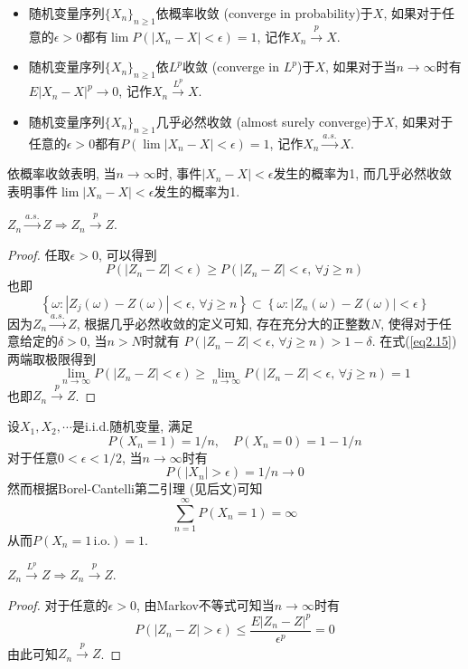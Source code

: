 \documentclass[cn, 12pt, math=mtpro2, bibstyle=apa, blue, twocol]{elegantbook}
\newcommand{\limn}{\lim_{n\to\infty}}
\begin{document}
\begin{definition}
\begin{itemize}
\item 随机变量序列$\{X_n\}_{n\ge1}$依概率收敛 (converge in probability)于$X$, 如果对于任意的$\epsilon>0$都有$\lim P(|X_n-X|<\epsilon)=1$, 记作$X_n\xrightarrow{p}X$.
\item 随机变量序列$\{X_n\}_{n\ge1}$依$L^p$收敛 (converge in $L^p$)于$X$, 如果对于当$n\to\infty$时有$E|X_n-X|^p\to0$, 记作$X_n\xrightarrow{L^p}X$.
\item 随机变量序列$\{X_n\}_{n\ge1}$几乎必然收敛 (almost surely converge)于$X$, 如果对于任意的$\epsilon>0$都有$P(\lim |X_n-X|<\epsilon)=1$, 记作$X_n\xrightarrow{a.s.}X$.
\end{itemize}
\end{definition}
\begin{remark}
依概率收敛表明, 当$n\to\infty$时, 事件$|X_n-X|<\epsilon$发生的概率为1, 而几乎必然收敛表明事件$\lim |X_n-X|<\epsilon$发生的概率为1.
\end{remark}
\begin{theorem}
$Z_n\xrightarrow{a.s.}Z\Rightarrow Z_n\xrightarrow{p}Z$.
\end{theorem}
\begin{proof}
  任取$\epsilon>0$, 可以得到
  \begin{equation}\label{eq2.15}
    P(|Z_n-Z|<\epsilon)\geq P(|Z_n-Z|<\epsilon,\,\forall j\geq n)
  \end{equation}
  也即
  $$\left\{\omega: |Z_j(\omega)-Z(\omega)|<\epsilon,\,\forall j\geq n\right\}\subset\left\{\omega: |Z_n(\omega)-Z(\omega)|<\epsilon\right\}$$
  因为$Z_n\xrightarrow{a.s.}Z$, 根据几乎必然收敛的定义可知, 存在充分大的正整数$N$, 使得对于任意给定的$\delta>0$, 当$n>N$时就有
  $P(|Z_n-Z|<\epsilon,\,\forall j\geq n)>1-\delta$. 在式(\ref{eq2.15})两端取极限得到
  $$\limn P(|Z_n-Z|<\epsilon)\geq \limn P(|Z_n-Z|<\epsilon,\,\forall j\geq n)=1$$
  也即$Z_n\xrightarrow{p}Z$.
\end{proof}
\begin{example}[依概率收敛但不几乎必然收敛]
设$X_1,X_2,\cdots$是i.i.d.随机变量, 满足
$$P(X_n=1)=1/n,\quad P(X_n=0)=1-1/n$$
对于任意$0<\epsilon<1/2$, 当$n\to\infty$时有
$$P(|X_n|>\epsilon)=1/n\to 0$$
然而根据Borel-Cantelli第二引理 (见后文)可知
$$\sum_{n=1}^{\infty} P(X_n=1)=\infty$$从而$P(X_n=1\,\text{i.o.})=1$.
\end{example}
\begin{theorem}\label{thm:thm2.12}
$Z_n\xrightarrow{L^p}Z\Rightarrow Z_n\xrightarrow{p}Z$.
\end{theorem}
\begin{proof}
对于任意的$\epsilon>0$, 由Markov不等式可知当$n\to\infty$时有
$$P(|Z_n-Z|>\epsilon)\leq \frac{E|Z_n-Z|^p}{\epsilon^p}=0$$
由此可知$Z_n\xrightarrow{p}Z$.
\end{proof}
\end{document}
